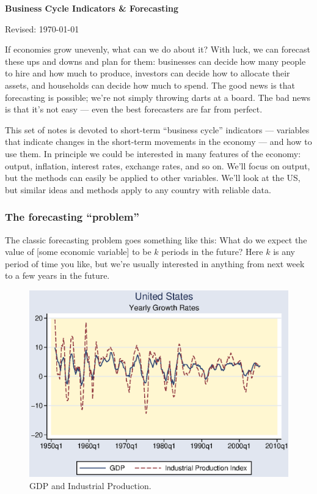 \documentclass[letterpaper,12pt]{article}
\def\HeadName{Business Cycle Indicators \& Forecasting}
\begin{document}
\thispagestyle{empty}%
\Head

\centerline{\large \bf \HeadName}%
\centerline{Revised: \today}

\bigskip
If economies grow unevenly, what can we do about it? 
With luck, we can forecast these ups and downs and plan for them:
businesses can decide how many people to hire and how much to produce, 
investors can decide how to allocate their assets, 
and households can decide how much to spend. 
The good news is that forecasting is possible;  
we're not simply throwing darts at a board.  
The bad news is that it's not easy --- 
even the best forecasters are far from perfect.

This set of notes is devoted to short-term ``business cycle''
indicators ---  variables that indicate changes in the short-term 
movements in the economy --- 
and how to use them.  
In principle we could be interested in many features of
the economy:  output, inflation, interest rates, 
exchange rates, and so on. 
We'll focus on output, but the methods can easily be applied 
to other variables.   
We'll look at the US, 
but similar ideas and methods apply to any country with reliable data. 


\subsubsection*{The forecasting ``problem''}

The classic forecasting problem goes something like this:  What do we expect the value of [some
economic variable] to be $k$ periods in the future?  
Here $k$ is any period of time you like, but
we're usually interested in anything from next week to a few years in 
the future.  

\begin{figure}
    \centering
    \includegraphics[scale=0.8]{us_gdp_indprod.eps}
    \caption{GDP and Industrial Production.}
    \label{fig:ip_gdp}%
\end{figure}
\end{document}
